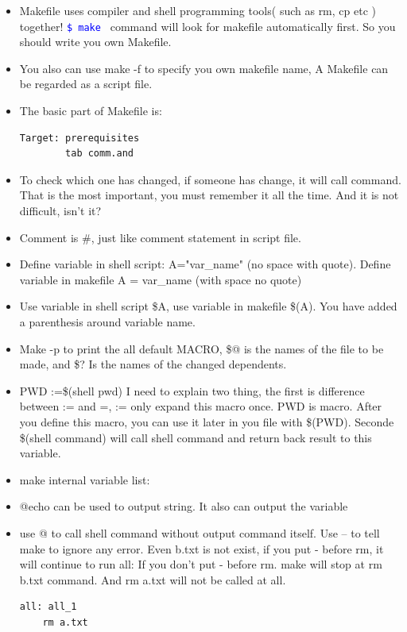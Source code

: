 \documentclass[a4paper,12pt,twoside]{book}
\newcommand{\linuxcommand}[1]{\texttt{\textcolor{blue}{\$ #1 \Pisymbol{psy}{191}}}}
\begin{document}
	\begin{itemize}
		\item Makefile uses compiler and shell programming tools( such as rm, cp etc ) together! \linuxcommand{make} command will look for makefile automatically first. So you should write you own Makefile.

		\item You also can use make -f to specify you own makefile name, A Makefile can be regarded as a script file.


		\item The basic part of Makefile is:
\begin{verbatim}
Target: prerequisites
		tab comm.and 
\end{verbatim}
				
										

		\item To check which one has changed, if someone has change, it will call command. That is the most important, you must remember it all the time.  And it is not difficult, isn't it?

		\item Comment is \#, just like comment statement in script file.
		
		\item Define variable in shell script: A="var\_name" (no space with quote). Define variable in makefile A = var\_name (with space no quote)

		\item Use variable in shell script \$A, use variable in makefile \$(A). You have added a parenthesis around variable name.  
		
		\item Make -p to print the all default MACRO, \$@ is the names of the file to be made, and \$? Is the names of the changed dependents.

		\item PWD :=\$(shell pwd) I need to explain two thing, the first is difference between := and =, := only expand this macro once.    PWD is macro. After you define this macro, you can use it later in you file with \$(PWD). Seconde \$(shell command) will call shell command and return back result to this variable. 

\item make internal variable list:

		\item @echo can be used to output string. It also can output the variable

		\item use @ to call shell command without output command itself. Use – to tell make to ignore any error. Even b.txt is not exist, if you put - before rm, it will continue to run all: If you don't put - before rm. make will stop at rm b.txt command. And rm a.txt will not be called at all.  
\begin{verbatim}
all: all_1
	rm a.txt
	 

\end{verbatim}
\end{itemize}
\end{document}
